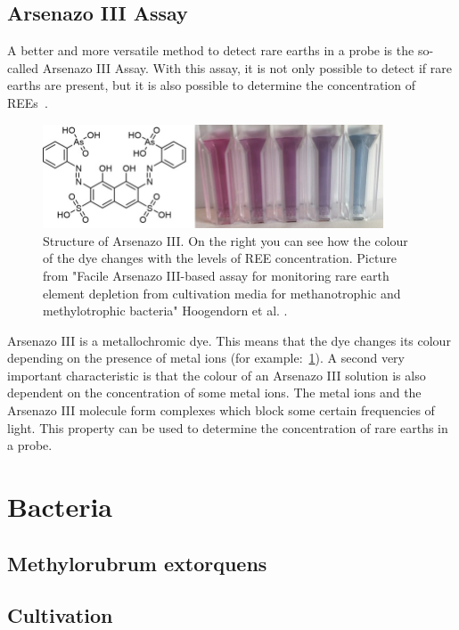 \subsection{Arsenazo III Assay}
A better and more versatile method to detect rare earths in a probe is the so-called Arsenazo III Assay.
With this assay, it is not only possible to detect if rare earths are present, but it is also possible to determine the concentration of REEs~\cite{arsenazo3assay}.

\begin{figure}[H]
    \centering
    \includegraphics[width=0.9\textwidth]{media/images/arsenazo3_structure_example}
    \caption{Structure of Arsenazo III. On the right you can see how the colour of the dye changes with the levels of REE concentration. Picture from "Facile Arsenazo III-based assay for monitoring rare earth element depletion from cultivation media for methanotrophic and methylotrophic bacteria" Hoogendorn et al. \cite{arsenazo3assay}.}
    \label{fig:arsenazo3}
\end{figure}

Arsenazo III is a metallochromic dye.
This means that the dye changes its colour depending on the presence of metal ions (for example:~\ref{fig:arsenazo3}).
A second very important characteristic is that the colour of an Arsenazo III solution is also dependent on the concentration of some metal ions.
The metal ions and the Arsenazo III molecule form complexes which block some certain frequencies of light.
This property can be used to determine the concentration of rare earths in a probe.


\section{Bacteria\authorB{}}

\subsection{Methylorubrum extorquens}

\subsection{Cultivation}


